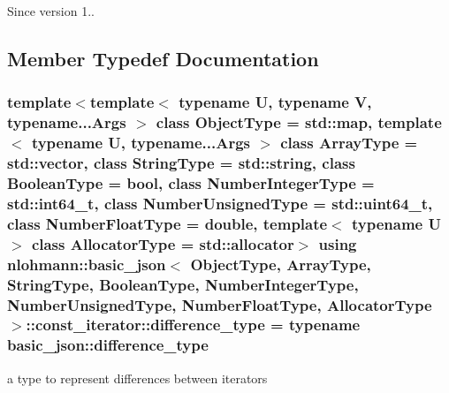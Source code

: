 \begin{DoxySince}{Since}
version 1.. 
\end{DoxySince}


\subsection{Member Typedef Documentation}
\hypertarget{classnlohmann_1_1basic__json_1_1const__iterator_a49d7c3e9ef3280df03052cce988b792f}{
\subsubsection[{difference\-\_\-type}]{\setlength{\rightskip}{0pt plus 5cm}template$<$template$<$ typename U, typename V, typename...\-Args $>$ class Object\-Type = std\-::map, template$<$ typename U, typename...\-Args $>$ class Array\-Type = std\-::vector, class String\-Type  = std\-::string, class Boolean\-Type  = bool, class Number\-Integer\-Type  = std\-::int64\-\_\-t, class Number\-Unsigned\-Type  = std\-::uint64\-\_\-t, class Number\-Float\-Type  = double, template$<$ typename U $>$ class Allocator\-Type = std\-::allocator$>$ using {\bf nlohmann\-::basic\-\_\-json}$<$ Object\-Type, Array\-Type, String\-Type, Boolean\-Type, Number\-Integer\-Type, Number\-Unsigned\-Type, Number\-Float\-Type, Allocator\-Type $>$\-::{\bf const\-\_\-iterator\-::difference\-\_\-type} =  typename {\bf basic\-\_\-json\-::difference\-\_\-type}}}\label{classnlohmann_1_1basic__json_1_1const__iterator_a49d7c3e9ef3280df03052cce988b792f}


a type to represent differences between iterators 

